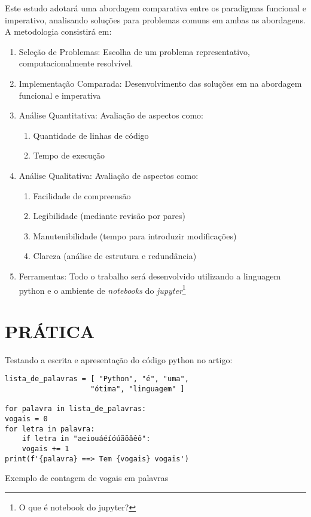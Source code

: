 \documentclass[date,twocolumn,a4paper]{ppgem}
\begin{document}
Este estudo adotará uma abordagem comparativa entre os paradigmas funcional e imperativo, analisando soluções para problemas comuns em ambas as abordagens. A metodologia consistirá em:
\begin{enumerate}
    \item Seleção de Problemas: Escolha de um problema representativo, computacionalmente resolvível.
    \item Implementação Comparada: Desenvolvimento das soluções em na abordagem funcional e imperativa
    \item Análise Quantitativa: Avaliação de aspectos como:
    \begin{enumerate}
        \item Quantidade de linhas de código
        \item Tempo de execução
    \end{enumerate}
    \item Análise Qualitativa: Avaliação de aspectos como:
    \begin{enumerate}
        \item Facilidade de compreensão
        \item Legibilidade (mediante revisão por pares)
        \item Manutenibilidade (tempo para introduzir modificações)
        \item Clareza (análise de estrutura e redundância)
    \end{enumerate}
    \item Ferramentas: Todo o trabalho será desenvolvido utilizando a linguagem python
        e o ambiente de \textit{notebooks} do \textit{jupyter}\footnote{O que é notebook do jupyter?}
\end{enumerate}




\section{PRÁTICA}

Testando a escrita e apresentação do código python no artigo:

\renewcommand{\listingscaption}{Código}

\begin{listing}[!ht]
\begin{verbatim}
lista_de_palavras = [ "Python", "é", "uma",
                    "ótima", "linguagem" ]
                    
for palavra in lista_de_palavras:
vogais = 0
for letra in palavra:
    if letra in "aeiouáéíóúãõâêô":
    vogais += 1
print(f'{palavra} ==> Tem {vogais} vogais')
\end{verbatim}
\caption{Exemplo de contagem de vogais em palavras}
\label{listing:2}
\end{listing}
\end{document}
